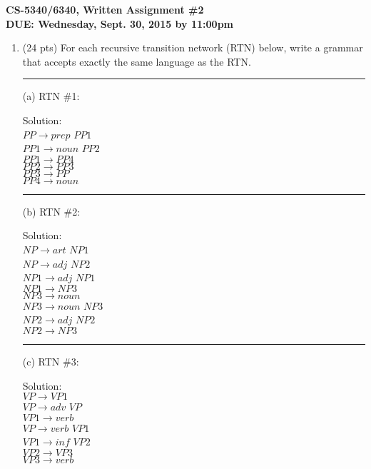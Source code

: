 \documentclass[11pt]{article}
\begin{document}
\large
\begin{center}
{\bf CS-5340/6340, Written Assignment \#2} \\
{\bf DUE: Wednesday, Sept. 30, 2015 by 11:00pm}
\end{center}
\normalsize

\begin{enumerate}  

\item (24 pts) For each recursive transition network (RTN) below,
  write a grammar that accepts exactly the same language as the
  RTN. \\ 

\hrule
(a) RTN \#1: 

Solution:\\

$PP \rightarrow prep$ $PP1$\\
$PP1 \rightarrow noun$ $PP2$\\
$PP1 \rightarrow PP4$\\
$PP2 \rightarrow PP3$\\
$PP3 \rightarrow PP$\\
$PP4 \rightarrow noun$\\

\hrule 
(b) RTN \#2: 

Solution: \\
$NP \rightarrow art$ $NP1$\\
$NP \rightarrow adj$ $NP2$\\
$NP1 \rightarrow adj$ $NP1$\\
$NP1 \rightarrow NP3$\\
$NP3 \rightarrow noun$\\
$NP3 \rightarrow noun$ $NP3$\\
$NP2 \rightarrow adj$ $NP2$\\
$NP2 \rightarrow NP3$\\

\hrule
(c) RTN \#3: 

Solution: \\
$VP \rightarrow VP1$\\
$VP \rightarrow adv$ $VP$\\
$VP1 \rightarrow verb$\\
$VP \rightarrow verb$ $VP1$\\
$VP1 \rightarrow inf$ $VP2$\\
$VP2 \rightarrow VP3$\\
$VP3 \rightarrow verb$\\




\end{enumerate}
\end{document}
